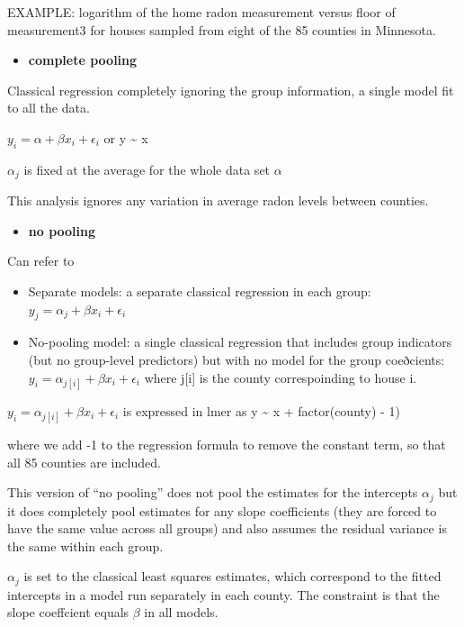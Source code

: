 \documentclass[
]{article}
\providecommand{\tightlist}{%
  \setlength{\itemsep}{0pt}\setlength{\parskip}{0pt}}
\begin{document}
EXAMPLE: logarithm of the home radon measurement versus floor of
measurement3 for houses sampled from eight of the 85 counties in
Minnesota.

\begin{itemize}
\tightlist
\item
  \textbf{complete pooling}
\end{itemize}

Classical regression completely ignoring the group information, a single
model fit to all the data.

\(y_i= \alpha +\beta x_i + \epsilon_i\) or y \textasciitilde{} x

\(\alpha_{j}\) is fixed at the average for the whole data set \(\alpha\)

This analysis ignores any variation in average radon levels between
counties.

\begin{itemize}
\tightlist
\item
  \textbf{no pooling}
\end{itemize}

Can refer to

\begin{itemize}
\item
  Separate models: a separate classical regression in each group:
  \(y_j= \alpha_{j} +\beta x_i + \epsilon_i\)
\item
  No-pooling model: a single classical regression that includes group
  indicators (but no group-level predictors) but with no model for the
  group coeðcients: \(y_i= \alpha_{j[i]} +\beta x_i + \epsilon_i\) where
  j{[}i{]} is the county correspoinding to house i.
\end{itemize}

\(y_i= \alpha_{j[i]} +\beta x_i + \epsilon_i\) is expressed in lmer as y
\textasciitilde{} x + factor(county) - 1)

where we add -1 to the regression formula to remove the constant term,
so that all 85 counties are included.

This version of ``no pooling'' does not pool the estimates for the
intercepts \(\alpha_{j}\) but it does completely pool estimates for any
slope coefficients (they are forced to have the same value across all
groups) and also assumes the residual variance is the same within each
group.

\(\alpha_{j}\) is set to the classical least squares estimates, which
correspond to the fitted intercepts in a model run separately in each
county. The constraint is that the slope coeffcient equals \(\beta\) in
all models.
\end{document}
